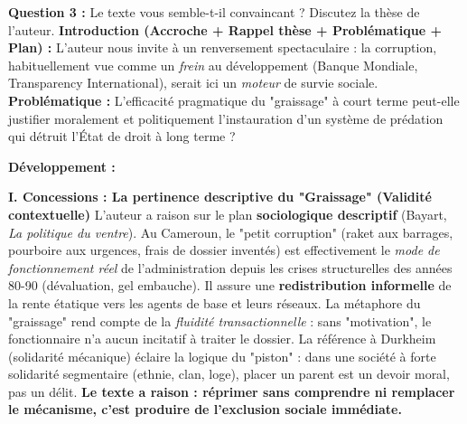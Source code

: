 \documentclass[11pt]{article}
\begin{document}
\begin{exoresolu}
\textbf{Question 3 :} Le texte vous semble-t-il convaincant ? Discutez la thèse de l'auteur. \tcblower
\textbf{Introduction (Accroche + Rappel thèse + Problématique + Plan) :}
L'auteur nous invite à un renversement spectaculaire : la corruption, habituellement vue comme un \emph{frein} au développement (Banque Mondiale, Transparency International), serait ici un \emph{moteur} de survie sociale. \textbf{Problématique :} L'efficacité pragmatique du "graissage" à court terme peut-elle justifier moralement et politiquement l'instauration d'un système de prédation qui détruit l'État de droit à long terme ?

\textbf{Développement :}

\textbf{I. Concessions : La pertinence descriptive du "Graissage" (Validité contextuelle)}
L'auteur a raison sur le plan \textbf{sociologique descriptif} (Bayart, \emph{La politique du ventre}). Au Cameroun, le "petit corruption" (raket aux barrages, pourboire aux urgences, frais de dossier inventés) est effectivement le \emph{mode de fonctionnement réel} de l'administration depuis les crises structurelles des années 80-90 (dévaluation, gel embauche). Il assure une \textbf{redistribution informelle} de la rente étatique vers les agents de base et leurs réseaux. La métaphore du "graissage" rend compte de la \emph{fluidité transactionnelle} : sans "motivation", le fonctionnaire n'a aucun incitatif à traiter le dossier. La référence à Durkheim (solidarité mécanique) éclaire la logique du "piston" : dans une société à forte solidarité segmentaire (ethnie, clan, loge), placer un parent est un devoir moral, pas un délit. \textbf{Le texte a raison : réprimer sans comprendre ni remplacer le mécanisme, c'est produire de l'exclusion sociale immédiate.}


\end{exoresolu}
\end{document}
